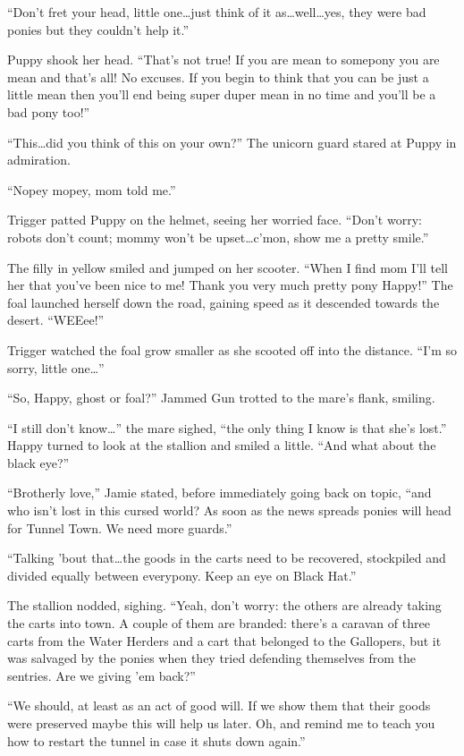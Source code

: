 ``Don't fret your head, little one\dots just think of it as\dots well\dots yes, they were bad ponies but they couldn't help it.''

Puppy shook her head. ``That's not true! If you are mean to somepony you are mean and that's all! No excuses. If you begin to think that you can be just a little mean then you'll end being super duper mean in no time and you'll be a bad pony too!''

``This\dots did you think of this on your own?'' The unicorn guard stared at Puppy in admiration.

``Nopey mopey, mom told me.''

Trigger patted Puppy on the helmet, seeing her worried face. ``Don't worry: robots don't count; mommy won't be upset\dots c'mon, show me a pretty smile.''

The filly in yellow smiled and jumped on her scooter. ``When I find mom I'll tell her that you've been nice to me! Thank you very much pretty pony Happy!'' The foal launched herself down the road, gaining speed as it descended towards the desert. ``WEEee!''

Trigger watched the foal grow smaller as she scooted off into the distance. ``I'm so sorry, little one\dots''

``So, Happy, ghost or foal?'' Jammed Gun trotted to the mare's flank, smiling.

``I still don't know\dots'' the mare sighed, ``the only thing I know is that she's lost.'' Happy turned to look at the stallion and smiled a little. ``And what about the black eye?''

``Brotherly love,'' Jamie stated, before immediately going back on topic, ``and who isn't lost in this cursed world? As soon as the news spreads ponies will head for Tunnel Town. We need more guards.''

``Talking 'bout that\dots the goods in the carts need to be recovered, stockpiled and divided equally between everypony. Keep an eye on Black Hat.''

The stallion nodded, sighing. ``Yeah, don't worry: the others are already taking the carts into town. A couple of them are branded: there's a caravan of three carts from the Water Herders and a cart that belonged to the Gallopers, but it was salvaged by the ponies when they tried defending themselves from the sentries. Are we giving 'em back?''

``We should, at least as an act of good will. If we show them that their goods were preserved maybe this will help us later. Oh, and remind me to teach you how to restart the tunnel in case it shuts down again.''

